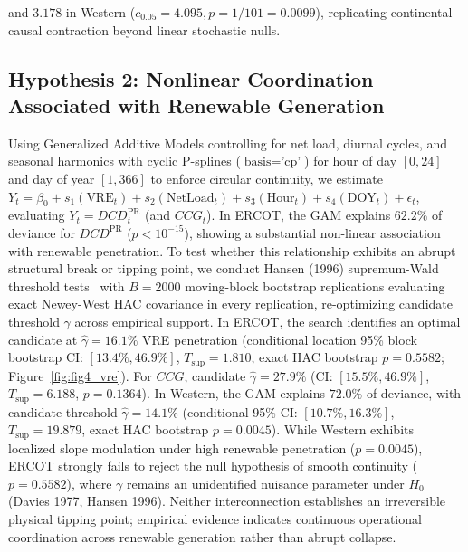 \documentclass[10pt,twocolumn,journal]{article}
\begin{document}
and $3.178$ in Western ($c_{0.05} = 4.095, p = 1/101 = 0.0099$), replicating continental causal contraction beyond linear stochastic nulls.

\subsection{Hypothesis 2: Nonlinear Coordination Associated with Renewable Generation}
Using Generalized Additive Models controlling for net load, diurnal cycles, and seasonal harmonics with cyclic P-splines ($\text{basis} = \text{'cp'}$) for hour of day $[0, 24]$ and day of year $[1, 366]$ to enforce circular continuity, we estimate $Y_t = \beta_0 + s_1(\text{VRE}_t) + s_2(\text{NetLoad}_t) + s_3(\text{Hour}_t) + s_4(\text{DOY}_t) + \epsilon_t$, evaluating $Y_t = DCD_t^{\text{PR}}$ (and $CCG_t$). In ERCOT, the GAM explains $62.2\%$ of deviance for $DCD^{\text{PR}}$ ($p < 10^{-15}$), showing a substantial non-linear association with renewable penetration. To test whether this relationship exhibits an abrupt structural break or tipping point, we conduct Hansen (1996) supremum-Wald threshold tests~\cite{hansen1996inference} with $B=2000$ moving-block bootstrap replications evaluating exact Newey-West HAC covariance in every replication, re-optimizing candidate threshold $\gamma$ across empirical support. In ERCOT, the search identifies an optimal candidate at $\hat{\gamma} = 16.1\%$ VRE penetration (conditional location 95\% block bootstrap CI: $[13.4\%, 46.9\%]$, $T_{\sup} = 1.810$, exact HAC bootstrap $p = 0.5582$; Figure~\ref{fig:fig4_vre}). For $CCG$, candidate $\hat{\gamma} = 27.9\%$ (CI: $[15.5\%, 46.9\%]$, $T_{\sup} = 6.188$, $p = 0.1364$). In Western, the GAM explains $72.0\%$ of deviance, with candidate threshold $\hat{\gamma} = 14.1\%$ (conditional 95\% CI: $[10.7\%, 16.3\%]$, $T_{\sup} = 19.879$, exact HAC bootstrap $p = 0.0045$). While Western exhibits localized slope modulation under high renewable penetration ($p = 0.0045$), ERCOT strongly fails to reject the null hypothesis of smooth continuity ($p = 0.5582$), where $\gamma$ remains an unidentified nuisance parameter under $H_0$ (Davies 1977, Hansen 1996). Neither interconnection establishes an irreversible physical tipping point; empirical evidence indicates continuous operational coordination across renewable generation rather than abrupt collapse.
\end{document}
